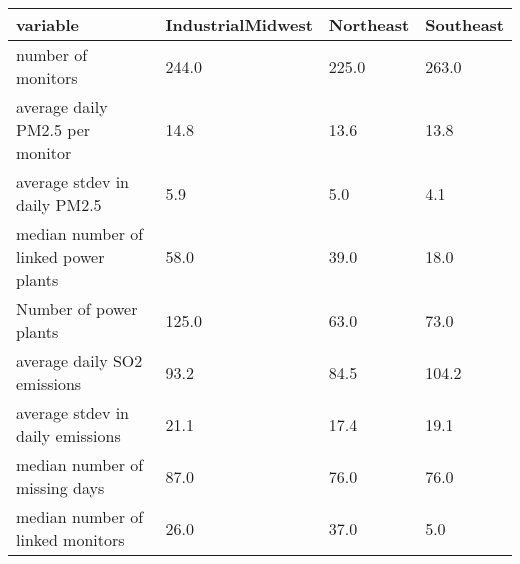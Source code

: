 \begin{table}[ht]
\centering
\begin{tabular}{llll}
  \hline
variable & IndustrialMidwest & Northeast & Southeast \\ 
  \hline
number of monitors & 244.0 & 225.0 & 263.0 \\ 
  average daily PM2.5 per monitor & 14.8 & 13.6 & 13.8 \\ 
  average stdev in daily PM2.5 & 5.9 & 5.0 & 4.1 \\ 
  median number of linked power plants & 58.0 & 39.0 & 18.0 \\ 
   \hline
Number of power plants & 125.0 & 63.0 & 73.0 \\ 
  average daily SO2 emissions & 93.2 & 84.5 & 104.2 \\ 
  average stdev in daily emissions & 21.1 & 17.4 & 19.1 \\ 
  median number of missing days & 87.0 & 76.0 & 76.0 \\ 
  median number of linked monitors & 26.0 & 37.0 & 5.0 \\ 
   \hline
\end{tabular}
\end{table}
